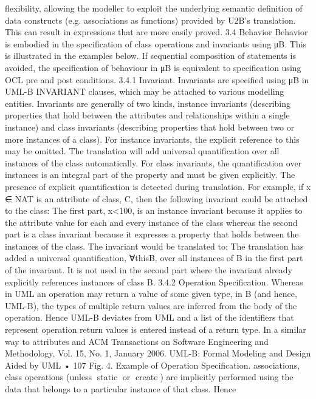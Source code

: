 flexibility, allowing the modeller to exploit the underlying semantic definition of
data constructs (e.g. associations as functions) provided by U2B’s translation.
This can result in expressions that are more easily proved.
3.4 Behavior
Behavior is embodied in the specification of class operations and invariants
using μB. This is illustrated in the examples below. If sequential composition
of statements is avoided, the specification of behaviour in μB is equivalent to
specification using OCL pre and post conditions.
3.4.1 Invariant. Invariants are specified using μB in UML-B INVARIANT
clauses, which may be attached to various modelling entities. Invariants are
generally of two kinds, instance invariants (describing properties that hold
between the attributes and relationships within a single instance) and class
invariants (describing properties that hold between two or more instances of
a class). For instance invariants, the explicit reference to this may be omitted. The translation will add universal quantification over all instances of the
class automatically. For class invariants, the quantification over instances is
an integral part of the property and must be given explicitly. The presence of
explicit quantification is detected during translation. For example, if x ∈ NAT is
an attribute of class, C, then the following invariant could be attached to the
class:
The first part, x<100, is an instance invariant because it applies to the attribute value for each and every instance of the class whereas the second part
is a class invariant because it expresses a property that holds between the
instances of the class. The invariant would be translated to:
The translation has added a universal quantification, ∀thisB, over all instances of B in the first part of the invariant. It is not used in the second part
where the invariant already explicitly references instances of class B.
3.4.2 Operation Specification. Whereas in UML an operation may return
a value of some given type, in B (and hence, UML-B), the types of multiple
return values are inferred from the body of the operation. Hence UML-B deviates from UML and a list of the identifiers that represent operation return
values is entered instead of a return type. In a similar way to attributes and
ACM Transactions on Software Engineering and Methodology, Vol. 15, No. 1, January 2006.
UML-B: Formal Modeling and Design Aided by UML • 107
Fig. 4. Example of Operation Specification.
associations, class operations (unless static or create) are implicitly performed using the data that belongs to a particular instance of that class. Hence
